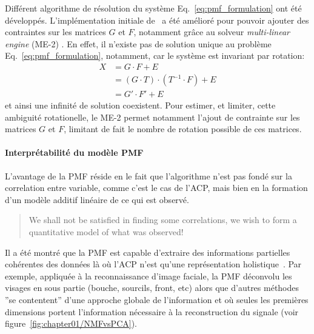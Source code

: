 Différent algorithme de résolution du système Eq.~\ref{eq:pmf_formulation} ont été développés.
L'implémentation initiale de~\textcite{paateroLeast1997} a été amélioré pour pouvoir
ajouter des contraintes sur les matrices $G$ et $F$, notamment grâce au solveur
\textit{multi-linear engine} (ME-2) \autocite{paateroMultilinear1999}. En effet, il
n'existe pas de solution unique au problème Eq.~\ref{eq:pmf_formulation}, notamment, car le
système est invariant par rotation:
\begin{align}
    \label{eq:rotationalambiguity}
    X   &= G \cdot F + E \\
        &= (G \cdot T) \cdot (T^{-1} \cdot F) + E\\
        &= G' \cdot F' + E
\end{align}
et ainsi une infinité de solution coexistent. Pour estimer, et limiter, cette ambiguité
rotationelle, le ME-2 permet notamment l'ajout de contrainte sur les matrices $G$ et $F$,
limitant de fait le nombre de rotation possible de ces matrices.

\paragraph{Interprétabilité du modèle PMF}%
\label{par:interpretabilite_du_model_PMF}

L'avantage de la PMF réside en le fait que l'algorithme n'est pas fondé sur la
correlation entre variable, comme c'est le cas de l'ACP, mais bien en la formation d'un
modèle additif linéaire de ce qui est observé.
\begin{quote}
    We shall not be satisfied in finding some correlations, we wish to form a quantitative
    model of what was observed! \autocite{paateroPositive1994}
\end{quote}

Il a été montré que la PMF est capable d'extraire des informations partielles cohérentes des
données là où l'ACP n'est qu'une représentation holistique~\autocite{leeLearning1999}. Par
exemple, appliquée à la reconnaissance d'image faciale, la PMF déconvolu les visages en
sous partie (bouche, sourcils, front, etc) alors que d'autres méthodes ''se contentent''
d'une approche globale de l'information et où seules les premières dimensions portent
l'information nécessaire à la reconstruction du signale (voir
figure~\ref{fig:chapter01/NMFvsPCA}).

